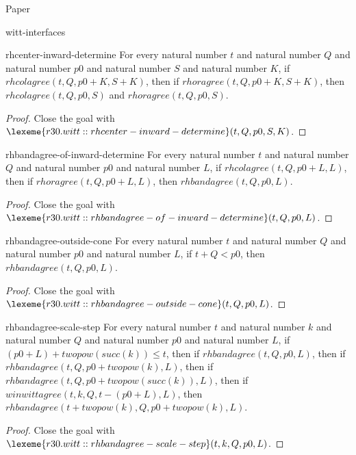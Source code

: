 \begin{lexlean}{Paper}
\begin{section}{witt-interfaces}
  \begin{theorem}{rhcenter-inward-determine}
  For every natural number \(t\) and natural number \(Q\) and natural number \(p0\) and natural number \(S\) and natural number \(K\), if \(rhcolagree(t, Q, p0 + K, S + K)\), then if \(rhoragree(t, Q, p0 + K, S + K)\), then \(rhcolagree(t, Q, p0, S)\) and \(rhoragree(t, Q, p0, S)\).
  \begin{proof}
  Close the goal with \(\lexeme{r30.witt::rhcenter-inward-determine}(t, Q, p0, S, K)\).
  \end{proof}
  \end{theorem}

  \begin{theorem}{rhbandagree-of-inward-determine}
  For every natural number \(t\) and natural number \(Q\) and natural number \(p0\) and natural number \(L\), if \(rhcolagree(t, Q, p0 + L, L)\), then if \(rhoragree(t, Q, p0 + L, L)\), then \(rhbandagree(t, Q, p0, L)\).
  \begin{proof}
  Close the goal with \(\lexeme{r30.witt::rhbandagree-of-inward-determine}(t, Q, p0, L)\).
  \end{proof}
  \end{theorem}

  \begin{theorem}{rhbandagree-outside-cone}
  For every natural number \(t\) and natural number \(Q\) and natural number \(p0\) and natural number \(L\), if \(t + Q < p0\), then \(rhbandagree(t, Q, p0, L)\).
  \begin{proof}
  Close the goal with \(\lexeme{r30.witt::rhbandagree-outside-cone}(t, Q, p0, L)\).
  \end{proof}
  \end{theorem}

  \begin{theorem}{rhbandagree-scale-step}
  For every natural number \(t\) and natural number \(k\) and natural number \(Q\) and natural number \(p0\) and natural number \(L\), if \((p0 + L) + twopow(succ(k)) ≤ t\), then if \(rhbandagree(t, Q, p0, L)\), then if \(rhbandagree(t, Q, p0 + twopow(k), L)\), then if \(rhbandagree(t, Q, p0 + twopow(succ(k)), L)\), then if \(winwittagree(t, k, Q, t - (p0 + L), L)\), then \(rhbandagree(t + twopow(k), Q, p0 + twopow(k), L)\).
  \begin{proof}
  Close the goal with \(\lexeme{r30.witt::rhbandagree-scale-step}(t, k, Q, p0, L)\).
  \end{proof}
  \end{theorem}


\end{section}
\end{lexlean}
